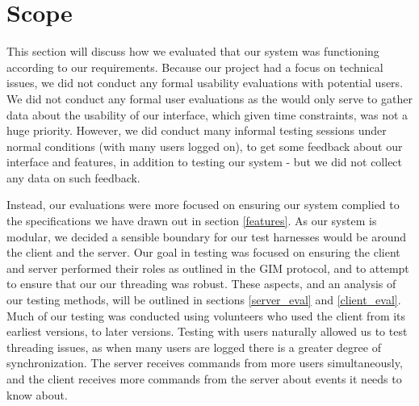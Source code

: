 \section{Scope}

This section will discuss how we evaluated that our system was functioning according to our requirements. Because our project had a focus on technical issues, we did not conduct any formal usability evaluations with potential users. We did not conduct any formal user evaluations as the would only serve to gather data about the usability of our interface, which given time constraints, was not a huge priority. However, we did conduct many informal testing sessions under normal conditions (with many users logged on), to get some feedback about our interface and features, in addition to testing our system - but we did not collect any data on such feedback. 

Instead, our evaluations were more focused on ensuring our system complied to the specifications we have drawn out in section \ref{features}. As our system is modular, we decided a sensible boundary for our test harnesses would be around the client and the server. Our goal in testing was focused on ensuring the client and server performed their roles as outlined in the GIM protocol, and to attempt to ensure that our our threading was robust.  These aspects, and an analysis of our testing methods, will be outlined in sections \ref{server_eval} and \ref{client_eval}. Much of our testing was conducted using volunteers who used the client from its earliest versions, to later versions. Testing with users naturally allowed us to test threading issues, as when many users are logged there is a greater degree of synchronization. The server receives commands from more users simultaneously, and the client receives more commands from the server about events it needs to know about.

